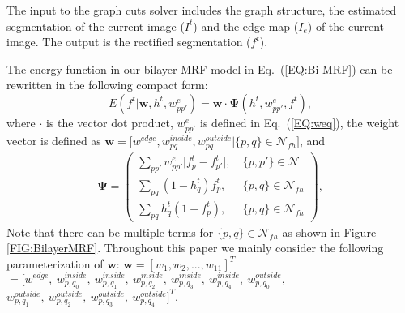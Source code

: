 \documentclass[10pt,journal,compsoc]{newIEEEtran}
\begin{document}
The input to the graph cuts solver includes the graph structure, the estimated segmentation of the current image ($I^t$) and the edge map ($I_e$) of the current image. The output is the rectified segmentation ($f^t$).

The energy function in our bilayer MRF model in Eq.~(\ref{EQ:Bi-MRF}) can be rewritten in the following compact form:
\begin{equation}\label{EQ:Bi-MRF_linear}
E(f^t|\mathbf{w},h^t,w^e_{pp'})
= \mathbf{w}\cdot \mathbf{\Psi}(h^t,w^e_{pp'},f^t),
\end{equation}
where $\cdot$ is the vector dot product, $w^e_{pp'}$ is defined in Eq.~(\ref{EQ:weq}), the weight vector is defined as $
\mathbf{w}=\big[w^{edge}, w^{inside}_{pq}, w^{outside}_{pq}|\{p,q\}\in \mathcal{N}_{fh}\big]
$, and
\begin{equation}\label{EQ:DefinePsi}
\begin{split}
\mathbf{\Psi} = \left(\begin{array}{lr}
                                              \sum_{pp'}w^{e}_{pp'} \big|f^{t}_p-{f^{t}_{p'}}\big|,&~\{p,p'\}\in\mathcal{N}~~ \\
                                              \sum_{pq}(1-h^t_q)f^{t}_p,&~\{p,q\}\in\mathcal{N}_{fh} \\
                                              \sum_{pq}h^t_q(1-f^{t}_p),&~\{p,q\}\in\mathcal{N}_{fh}
                                            \end{array}\right),
\end{split}
\end{equation}
Note that there can be multiple terms for $\{p,q\}\in \mathcal{N}_{fh}$ as shown in Figure \ref{FIG:BilayerMRF}. Throughout this paper we mainly consider the following parameterization of $\mathbf{w}$: $\mathbf{w} = [w_1,w_2,...,w_{11}]^T$$ = [w^{edge},~ w^{inside}_{p,q_0},~w^{inside}_{p,q_1}, ~w^{inside}_{p,q_2},~w^{inside}_{p,q_3},  ~w^{inside}_{p,q_4}, ~w^{outside}_{p,q_0}, $$ w^{outside}_{p,q_1},~ w^{outside}_{p,q_2},~w^{outside}_{p,q_3},~w^{outside}_{p,q_4}]^T$.
\end{document}
